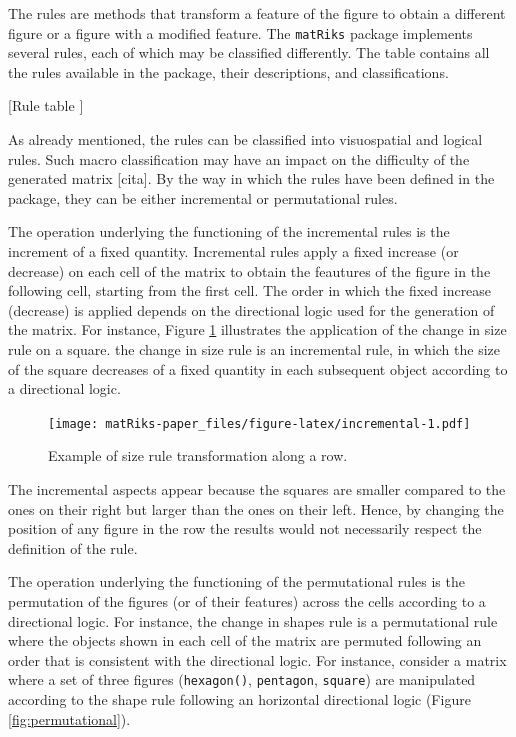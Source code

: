 The rules are methods that transform a feature of the figure to obtain a different figure or a figure with a modified feature.
The \texttt{matRiks} package implements several rules, each of which may be classified differently.
The table contains all the rules available in the package, their descriptions, and classifications.

{[}Rule table {]}

As already mentioned, the rules can be classified into visuospatial and logical rules.
Such macro classification may have an impact on the difficulty of the generated matrix {[}cita{]}.
By the way in which the rules have been defined in the  package, they can be either incremental or permutational rules.

The operation underlying the functioning of the incremental rules is the increment of a fixed quantity.
Incremental rules apply a fixed increase (or decrease) on each cell of the matrix to obtain the feautures of the figure in the following cell, starting from the first cell.
The order in which the fixed increase (decrease) is applied depends on the directional logic used for the generation of the matrix.
For instance, Figure \ref{fig:incremental} illustrates the application of the change in size rule on a square. the change in size rule is an incremental rule, in which the size of the square decreases of a fixed quantity in each subsequent object according to a directional logic.

\begin{figure}
\centering
\texttt{[image: matRiks-paper\_files/figure-latex/incremental-1.pdf]}
\caption{\label{fig:incremental}Example of size rule transformation along a row.}
\end{figure}

The incremental aspects appear because the squares are smaller compared to the ones on their right but larger than the ones on their left.
Hence, by changing the position of any figure in the row the results would not necessarily respect the definition of the rule.

The operation underlying the functioning of the permutational rules is the permutation of the figures (or of their features) across the cells according to a directional logic.
For instance, the change in shapes rule is a permutational rule where the objects shown in each cell of the matrix are permuted following an order that is consistent with the directional logic.
For instance, consider a matrix where a set of three figures (\texttt{hexagon()}, \texttt{pentagon}, \texttt{square}) are manipulated according to the shape rule following an horizontal directional logic (Figure \ref{fig:permutational}).

